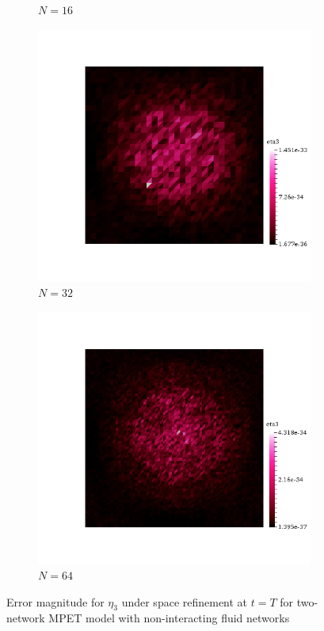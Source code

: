 \begin{figure}[h!]
\begin{subfigure}[b]{0.24\textwidth}
    \caption{$N=16$}
  \end{subfigure}
  \begin{subfigure}[b]{0.24\textwidth}
    \includegraphics[width=\textwidth,height=\textheight,keepaspectratio,height=\textheight,keepaspectratio]{figures/2_mpet/no_transfer/space/eta3_32.png}
    \caption{$N=32$}
  \end{subfigure}
  \begin{subfigure}[b]{0.24\textwidth}
    \includegraphics[width=\textwidth,height=\textheight,keepaspectratio,height=\textheight,keepaspectratio]{figures/2_mpet/no_transfer/space/eta3_64.png}
    \caption{$N=64$}
  \end{subfigure}
  \caption{Error magnitude for $\eta_3$ under space refinement at $t=T$ for two-network MPET model with non-interacting fluid networks} \label{fig:bb_no_transfer_eta3}
\end{figure}

